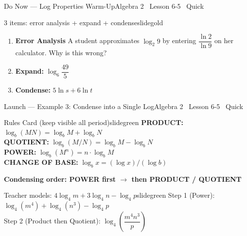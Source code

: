 \documentclass[aspectratio=169, 11pt]{beamer}
\begin{document}

\begin{frame}{Do Now --- Log Properties Warm-Up}{Algebra 2 \textperiodcentered\ Lesson 6-5 \textperiodcentered\ Quick}
\vspace{0.2cm}
\begin{projcard}{3 items: error analysis + expand + condense}{slidegold}
\begin{enumerate}
  \setlength{\itemsep}{4pt}
  \item \textbf{Error Analysis} A student approximates \(\log_2 9\) by entering
        \(\dfrac{\ln 2}{\ln 9}\) on her calculator. Why is this wrong?
  \item \textbf{Expand:} \(\log_6\!\dfrac{49}{5}\)
  \item \textbf{Condense:} \(5\ln s + 6\ln t\)
\end{enumerate}
\end{projcard}
\end{frame}

\begin{frame}{Launch --- Example 3: Condense into a Single Log}{Algebra 2 \textperiodcentered\ Lesson 6-5 \textperiodcentered\ Quick}
\vspace{0.15cm}
\begin{projcard}{Rules Card (keep visible all period)}{slidegreen}
\small
\textbf{PRODUCT:} \(\log_b(MN) = \log_b M + \log_b N\)\\[2pt]
\textbf{QUOTIENT:} \(\log_b(M/N) = \log_b M - \log_b N\)\\[2pt]
\textbf{POWER:} \(\log_b(M^n) = n\cdot\log_b M\)\\[2pt]
\textbf{CHANGE OF BASE:} \(\log_b x = (\log x)/(\log b)\)

\smallskip
\textcolor{slideaccent}{\textbf{Condensing order: POWER first \(\rightarrow\) then PRODUCT / QUOTIENT}}
\end{projcard}

\vspace{0.1cm}
\begin{projcard}{Teacher models: \(4\log_4 m + 3\log_4 n - \log_4 p\)}{slidegreen}
\small
Step 1 (Power): \(\log_4(m^4) + \log_4(n^3) - \log_4 p\)\\
Step 2 (Product then Quotient): \(\log_4\!\left(\dfrac{m^4 n^3}{p}\right)\)
\end{projcard}
\end{frame}
\end{document}

